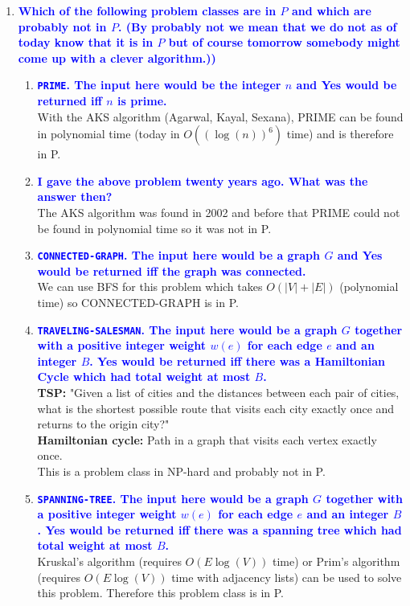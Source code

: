 \documentclass[11pt]{article}
\begin{document}
\begin{enumerate}
\item \textbf{\textcolor{blue}{Which of the following problem classes are in $P$ and which are probably not in $P$.  (By probably not we mean that we do not as of today know that it is in $P$ but of course tomorrow somebody might come up with a clever algorithm.))}}
\begin{enumerate}
    \item \textbf{\textcolor{blue}{{\tt PRIME}. The input here would be the integer $n$ and Yes would be returned iff $n$ is prime.}}
        \\ With the AKS algorithm (Agarwal, Kayal, Sexana), PRIME can be found in polynomial time (today in $O((\log(n))^6)$ time) and is therefore in P.
    \item \textbf{\textcolor{blue}{I gave the above problem twenty years ago.  What was the answer then?}}
        \\ The AKS algorithm was found in 2002 and before that PRIME could not be found in polynomial time so it was not in P.
    \item \textbf{\textcolor{blue}{{\tt CONNECTED-GRAPH}.  The input here would be a graph $G$ and Yes would be returned iff the graph was connected.}}
        \\ We can use BFS for this problem which takes $O(|V| + |E|)$ (polynomial time) so CONNECTED-GRAPH is in P.
    \item \textbf{\textcolor{blue}{{\tt TRAVELING-SALESMAN}. The input here would be a graph $G$ together with a positive integer weight $w(e)$ for each edge $e$ and an integer $B$.  Yes would be returned iff there was a Hamiltonian Cycle which had total weight at most $B$.}}
        \\ \textbf{TSP: } "Given a list of cities and the distances between each pair of cities, what is the shortest possible route that visits each city exactly once and returns to the origin city?"
        \\ \textbf{Hamiltonian cycle: } Path in a graph that visits each vertex exactly once.
        \\ This is a problem class in NP-hard and probably not in P.
    \item \textbf{\textcolor{blue}{{\tt SPANNING-TREE}. The input here would be a graph $G$ together with a positive integer weight $w(e)$ for each edge $e$ and an integer $B$.  Yes would be returned iff there was a spanning tree which had total weight at most $B$.}}
        \\ Kruskal's algorithm (requires $O(E\log(V))$ time) or Prim's algorithm (requires $O(E\log(V))$ time with adjacency lists) can be used to solve this problem. Therefore this problem class is in P.

\end{enumerate}
\end{enumerate}
\end{document}
